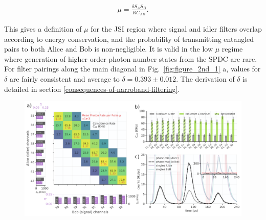 \documentclass[11pt]{caltech_thesis} %
\begin{document}
\begin{align}
\mu =  \frac{\delta S_A S_B}{R C_{AB}}.
\end{align}

This gives a definition of $\mu$ for the JSI region where signal and idler filters overlap according to energy conservation, and the probability of transmitting entangled pairs to both Alice and Bob is non-negligible. It is valid in the low $\mu$ regime where generation of higher order photon number states from the SPDC are rare. For filter pairings along the main diagonal in Fig.~\ref{fig:figure_2nd_1} a, values for $\delta$ are fairly consistent and average to $\delta = 0.393 \pm 0.012$. The derivation of $\delta$ is detailed in section \ref{consequences-of-narroband-filtering}.

\hypertarget{fig:figure_2nd_1}{%
\begin{figure}
\centering
\includegraphics[width=1\textwidth,height=\textheight]{./chapter_05/figs/jsi_figure_light.pdf}

\end{figure}}
\end{document}
